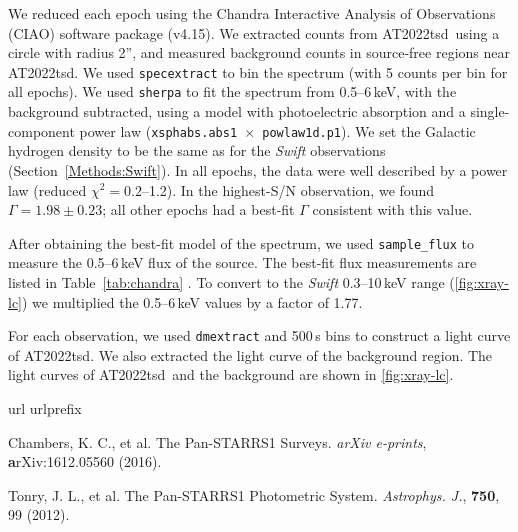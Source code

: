\documentclass{nature_plusfigure}
\newcommand{\apj}{{Astrophys. J.}}
\newcommand{\at}{AT2022tsd}
\begin{document}
\begin{methods}
We reduced each epoch using the Chandra Interactive Analysis of Observations (CIAO\cite{Fruscione2006}) software package (v4.15). We extracted counts from \at\ using a circle with radius 2'', and measured background counts in source-free regions near \at.
We used \texttt{specextract} to bin the spectrum (with 5 counts per bin for all epochs). We used \texttt{sherpa} to fit the spectrum from 0.5--6\,keV, with the background subtracted, using a model with photoelectric absorption and a single-component power law (\texttt{xsphabs.abs1 $\times$ powlaw1d.p1}). We set the Galactic hydrogen density to be the same as for the \emph{Swift} observations (Section~\ref{Methods:Swift}). In all epochs, the data were well described by a power law (reduced $\chi^2=0.2$--1.2). In the highest-S/N observation, we found $\Gamma=1.98\pm0.23$; all other epochs had a best-fit $\Gamma$ consistent with this value.

After obtaining the best-fit model of the spectrum, we used \texttt{sample\_flux} to measure the 0.5--6\,keV flux of the source. The best-fit flux measurements are listed in Table~\ref{tab:chandra} . To convert to the \emph{Swift} 0.3--10\,keV range (\ref{fig:xray-lc}) we multiplied the 0.5--6\,keV values by a factor of 1.77.

For each observation, we used \texttt{dmextract} and 500\,s bins to construct a light curve of \at. We also extracted the light curve of the background region. The light curves of \at\ and the background are shown in \ref{fig:xray-lc}. 

\vspace{1in}
%
%

\begin{thebibliography}{10}
\expandafter\ifx\csname url\endcsname\relax
  \def\url#1{\texttt{#1}}\fi
\expandafter\ifx\csname urlprefix\endcsname\relax\def\urlprefix{URL }\fi
\providecommand{\bibinfo}[2]{#2}
\providecommand{\eprint}[2][]{\url{#2}}
\makeatletter
\addtocounter{\@listctr}{37}
\makeatother


 Chambers, K. C., et al. The Pan-STARRS1 Surveys. \emph{arXiv e-prints}, \textbf arXiv:1612.05560 (2016). 

 Tonry, J. L., et al. The Pan-STARRS1 Photometric System. \emph{\apj}, \textbf{750}, 99 (2012). 


\end{thebibliography}
\end{methods}
\end{document}
